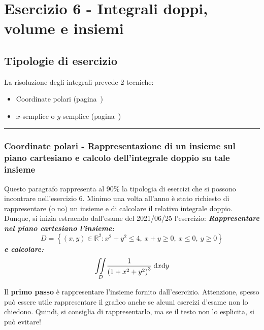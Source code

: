 \documentclass[a4paper]{article}
\newcommand{\longline}{\noindent\rule{\textwidth}{0.4pt}}
\begin{document}
	\section{Esercizio 6 - Integrali doppi, volume e insiemi}

	\subsection{Tipologie di esercizio}

	La risoluzione degli integrali prevede 2 tecniche:
	\begin{itemize}
		\item Coordinate polari (pagina~\pageref{par: coordinate polari})
		\item $x$-semplice o $y$-semplice (pagina~\pageref{par: x-semplice e y-semplice - calcolo integrale doppio})
	\end{itemize}

	\longline

	\subsubsection{Coordinate polari - Rappresentazione di un insieme sul piano cartesiano e calcolo dell'integrale doppio su tale insieme}\label{par: coordinate polari}

	Questo paragrafo rappresenta al 90\% la tipologia di esercizi che si possono incontrare nell'esercizio 6. Minimo una volta all'anno è stato richiesto di rappresentare (o no) un insieme e di calcolare il relativo integrale doppio. Dunque, si inizia estraendo dall'esame del 2021/06/25 l'esercizio: \textcolor{Green4}{\textbf{\emph{Rappresentare nel piano cartesiano l'insieme:}}
	\begin{equation*}
		D = \left\{\left(x,y\right) \in \mathbb{R}^{2} : x^{2}+y^{2} \le 4, \: x+y \ge 0, \: x \le 0, \: y \ge 0\right\}
	\end{equation*}
	\textbf{\emph{e calcolare:}}
	\begin{equation*}
		\underset{D}{\int \hspace{-.5em} \int} \dfrac{1}{\left(1 + x^{2} + y^{2}\right)^{3}} \: \mathrm{d}x \mathrm{d}y
	\end{equation*}}\newline

	\noindent
	Il \textbf{primo passo} è rappresentare l'insieme fornito dall'esercizio. Attenzione, spesso può essere utile rappresentare il grafico anche se alcuni esercizi d'esame non lo chiedono. Quindi, si consiglia di rappresentarlo, ma se il testo non lo esplicita, si può evitare!
\end{document}
